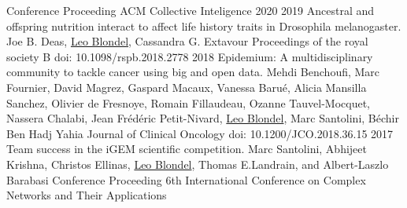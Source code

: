 \documentclass[]{twentysecondcv}
\begin{document}
\begin{twentyshort}
    {Conference Proceeding}
    {ACM Collective Inteligence 2020}
  \twentyitemcite
    {2019}
    {Ancestral and offspring nutrition interact to affect life history traits in Drosophila melanogaster.}
    {Joe B. Deas, \underline{Leo Blondel}, Cassandra G. Extavour}
	{Proceedings of the royal society B}
    {doi: 10.1098/rspb.2018.2778}
  \twentyitemcite
    {2018}
    {Epidemium: A multidisciplinary community to tackle cancer using big and open data.}
    {Mehdi Benchoufi, Marc Fournier, David Magrez, Gaspard Macaux, Vanessa Barué, Alicia Mansilla Sanchez, Olivier de Fresnoye, Romain Fillaudeau, Ozanne Tauvel-Mocquet, Nassera Chalabi, Jean Frédéric Petit-Nivard, \underline{Leo Blondel}, Marc Santolini, Béchir Ben Hadj Yahia}
	{Journal of Clinical Oncology}
    {doi: 10.1200/JCO.2018.36.15}
  \twentyitemcite
    {2017}
    {Team success in the iGEM scientific competition.}
    {Marc Santolini, Abhijeet Krishna, Christos Ellinas, \underline{Leo Blondel}, Thomas E.Landrain, and Albert-Laszlo Barabasi}
	{Conference Proceeding}
    {6th International Conference on Complex Networks and Their Applications}
\end{twentyshort}

\makesmallprofile
\end{document}
